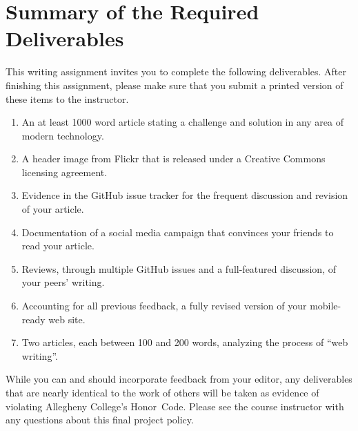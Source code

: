 \section*{Summary of the Required Deliverables}

This writing assignment invites you to complete the following deliverables. After finishing this assignment, please make
sure that you submit a printed version of these items to the instructor.

\vspace*{-.1in}
\begin{enumerate}
  \setlength{\itemsep}{-.01in}

  \item An at least 1000 word article stating a challenge and solution in any area of modern technology.
  \item A header image from Flickr that is released under a Creative Commons licensing agreement.
  \item Evidence in the GitHub issue tracker for the frequent discussion and revision of your article.
  \item Documentation of a social media campaign that convinces your friends to read your article.
  \item Reviews, through multiple GitHub issues and a full-featured discussion, of your peers' writing.
  \item Accounting for all previous feedback, a fully revised version of your mobile-ready web site.
  \item Two articles, each between 100 and 200 words, analyzing the process of ``web writing''.
\end{enumerate}
\vspace*{-.1in}


While you can and should incorporate feedback from your editor, any deliverables that are nearly identical to the work
of others will be taken as evidence of violating Allegheny College's \mbox{Honor Code}. Please see the course instructor
with any questions about this final project policy.


